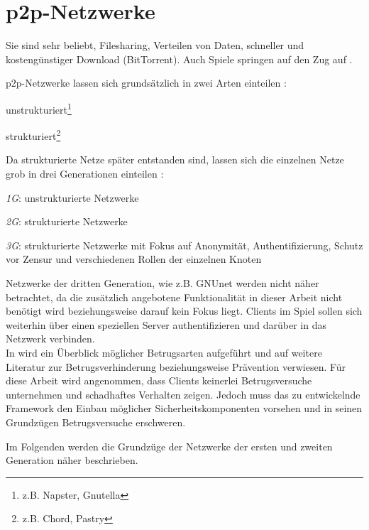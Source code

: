 \section{p2p-Netzwerke}
\label{chap:grundlagen:p2p}
Sie sind sehr beliebt, Filesharing, Verteilen von Daten, schneller und kostengünstiger Download (BitTorrent). Auch Spiele springen auf den Zug auf \cite{Knutsson2004Peertopeer, Triebel2008Peertopeer}.

p2p-Netzwerke lassen sich grundsätzlich in zwei Arten einteilen \cite{Steinmetz2005, Lua2005Survey}: 
\begin{itemize*}
\item unstrukturiert\footnote{z.B. Napster, Gnutella}
\item strukturiert\footnote{z.B. Chord, Pastry}
\end{itemize*}

Da strukturierte Netze später entstanden sind, lassen sich die einzelnen Netze grob in drei Generationen einteilen \cite{Bo2003PeertoPeer}:
\begin{itemize*}
	\item \emph{1G}: unstrukturierte Netzwerke
	\item \emph{2G}: strukturierte Netzwerke
	\item \emph{3G}: strukturierte Netzwerke mit Fokus auf Anonymität, Authentifizierung, Schutz vor Zensur und verschiedenen Rollen der einzelnen Knoten
\end{itemize*}

Netzwerke der dritten Generation, wie z.B. GNUnet \cite{Grothoff2002GNET} werden nicht näher betrachtet, da die zusätzlich angebotene Funktionalität in dieser Arbeit nicht benötigt wird beziehungsweise darauf kein Fokus liegt. Clients im Spiel sollen sich weiterhin über einen speziellen Server authentifizieren und darüber in das Netzwerk verbinden.\\
In  wird ein Überblick möglicher Betrugsarten aufgeführt und auf weitere Literatur zur Betrugsverhinderung beziehungsweise Prävention verwiesen. Für diese Arbeit wird angenommen, dass Clients keinerlei Betrugsversuche unternehmen und schadhaftes Verhalten zeigen. Jedoch muss das zu entwickelnde Framework den Einbau möglicher Sicherheitskomponenten vorsehen und in seinen Grundzügen Betrugsversuche erschweren.

Im Folgenden werden die Grundzüge der Netzwerke der ersten und zweiten Generation näher beschrieben.

